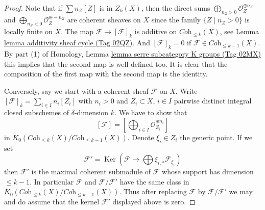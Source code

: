 \documentclass{amsart}
\theoremstyle{plain}
\theoremstyle{definition}
\theoremstyle{remark}
\numberwithin{equation}{subsection}
\def\Ker{\mathop{\mathrm{Ker}}}
\begin{document}
\begin{proof}
Note that if $\sum n_Z[Z]$ is in $Z_k(X)$, then
the direct sums
$\bigoplus\nolimits_{n_Z > 0} \mathcal{O}_Z^{\oplus n_Z}$ and
$\bigoplus\nolimits_{n_Z < 0} \mathcal{O}_Z^{\oplus -n_Z}$
are coherent sheaves on $X$ since the family $\{Z \mid n_Z > 0\}$
is locally finite on $X$.
The map $\mathcal{F} \to [\mathcal{F}]_k$ is additive
on $\textit{Coh}_{\leq k}(X)$, see
Lemma \href{https://stacks.math.columbia.edu/tag/02QZ}{lemma additivity sheaf cycle (Tag 02QZ)}. And $[\mathcal{F}]_k = 0$
if $\mathcal{F} \in \textit{Coh}_{\leq k - 1}(X)$. By part (1)
of Homology, Lemma \href{https://stacks.math.columbia.edu/tag/02MX}{lemma serre subcategory K groups (Tag 02MX)}
this implies that the second map is well defined too.
It is clear that the composition of the first map with the second
map is the identity.

\medskip\noindent
Conversely, say we start with a coherent sheaf $\mathcal{F}$
on $X$. Write $[\mathcal{F}]_k = \sum_{i \in I} n_i[Z_i]$
with $n_i > 0$ and $Z_i \subset X$, $i \in I$
pairwise distinct integral closed subschemes of $\delta$-dimension $k$.
We have to show that
$$
[\mathcal{F}] = [\bigoplus\nolimits_{i \in I} \mathcal{O}_{Z_i}^{\oplus n_i}]
$$
in $K_0(\textit{Coh}_{\leq k}(X)/\textit{Coh}_{\leq k - 1}(X))$.
Denote $\xi_i \in Z_i$ the generic point.
If we set
$$
\mathcal{F}' = \Ker(\mathcal{F} \to \bigoplus \xi_{i, *}\mathcal{F}_{\xi_i})
$$
then $\mathcal{F}'$ is the maximal coherent submodule of $\mathcal{F}$
whose support has dimension $\leq k - 1$. In particular $\mathcal{F}$
and $\mathcal{F}/\mathcal{F}'$ have the same class in
$K_0(\textit{Coh}_{\leq k}(X)/\textit{Coh}_{\leq k - 1}(X))$.
Thus after replacing $\mathcal{F}$ by $\mathcal{F}/\mathcal{F}'$
we may and do assume that the kernel $\mathcal{F}'$ displayed
above is zero.


\end{proof}
\end{document}
